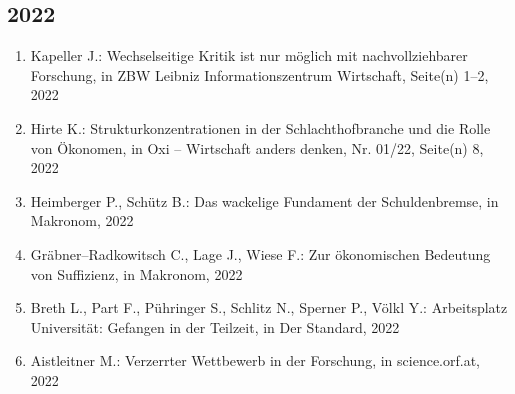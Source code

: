 \subsection*{2022}
\begin{enumerate}
    	 \item Kapeller J.: Wechselseitige Kritik ist nur möglich mit nachvollziehbarer Forschung, in ZBW Leibniz Informationszentrum Wirtschaft, Seite(n) 1--2, 2022
	 \item Hirte K.: Strukturkonzentrationen in der Schlachthofbranche und die Rolle von Ökonomen, in Oxi -- Wirtschaft anders denken, Nr. 01/22, Seite(n) 8, 2022
	 \item Heimberger P., Schütz B.: Das wackelige Fundament der Schuldenbremse, in Makronom, 2022
	 \item Gräbner--Radkowitsch C., Lage J., Wiese F.: Zur ökonomischen Bedeutung von Suffizienz, in Makronom, 2022
	 \item Breth L., Part F., Pühringer S., Schlitz N., Sperner P., Völkl Y.: Arbeitsplatz Universität: Gefangen in der Teilzeit, in Der Standard, 2022
	 \item Aistleitner M.: Verzerrter Wettbewerb in der Forschung, in science.orf.at, 2022
\end{enumerate}

